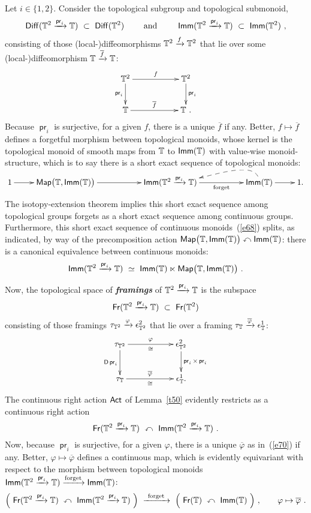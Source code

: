 \documentclass{amsart}
\theoremstyle{definition}
\theoremstyle{remark}
\DeclareMathOperator{\pr}{\mathsf{pr}}
\DeclareMathOperator{\Map}{{\sf Map}}
\newcommand{\bit}[1]{\textbf{\textit{#1}}}
\newcommand{\racts}{\curvearrowleft}
\DeclareMathOperator{\Diff}{{\sf Diff}}
\newcommand{\ov}{\overline}
\newcommand{\xra}{\xrightarrow}
\DeclareMathOperator{\Fr}{\sf Fr}
\DeclareMathOperator{\Act}{\sf Act}
\DeclareMathOperator{\Imm}{\sf Imm}
\begin{document}
Let $ i\in \{1,2\}$.
Consider the topological subgroup and topological submonoid,
\[
\Diff(\TT^2 \xra{\pr_i} \TT)
~\subset~
\Diff(\TT^2)
\qquad
\text{ and }
\qquad
\Imm(\TT^2 \xra{\pr_i} \TT)
~\subset~
\Imm(\TT^2)
~,
\]
consisting of those (local-)diffeomorphisms $\TT^2\xra{f} \TT^2$ that lie over some (local-)diffeomorphism $\TT\xra{\ov{f}} \TT$:
\[
\xymatrix{
\TT^2
\ar[rr]^-f
\ar[d]_-{\pr_i}
&&
\TT^2 \ar[d]^-{\pr_i}
\\
\TT
\ar[rr]^-{\ov{f}}
&&
\TT
~.
}
\]
Because $\pr_i$ is surjective, for a given $f$, there is a unique $\ov{f}$ if any.
Better, $f\mapsto \ov{f}$ defines a forgetful morphism between topological monoids, whose kernel is the topological monoid of smooth maps from $\mathbb T$ to $\Imm(\TT)$ with value-wise monoid-structure, which is to say
there is a short exact sequence of topological monoids:
\begin{equation}
\label{e68}
\xymatrix{
1
\ar[r] 
&
\Map\bigl( \TT , \Imm(\TT) \bigr) 
\ar[rr]
&&
\Imm(\TT^2 \xra{\pr_i} \TT)
\ar[rr]_-{ \rm forget }
&&
\Imm(\TT)
\ar[r]
\ar@{-->}@(u,-)[ll]
&
1
.
}
\end{equation}
The isotopy-extension theorem implies this short exact sequence among topological groups forgets as a short exact sequence among continuous groups.  
Furthermore, this short exact sequence of continuous monoids~(\ref{e68}) splits, as indicated, by way of the precomposition action $\Map\bigl( \TT , \Imm(\TT) \bigr)  \racts \Imm(\TT)$:
there is a canonical equivalence between continuous monoids:
\begin{equation*}
\Imm(\TT^2 \xra{\pr_i} \TT)
~\simeq~
\Imm(\TT)  \ltimes  \Map\bigl( \TT , \Imm(\TT) \bigr)
~.
\end{equation*}





Now, the topological space of \bit{framings} of $\TT^2 \xra{\pr_i} \TT$ is the subspace
\[
\Fr(\TT^2 \xra{\pr_i} \TT)
~\subset~
\Fr(\TT^2)
\]
consisting of those framings $\tau_{\TT^2}\xra{\varphi} \epsilon^2_{\TT^2}$ that lie over a framing $\tau_{\TT} \xra{\ov{\varphi}} \epsilon^1_{\TT}$:
\begin{equation}
\label{e70}
\xymatrix{
\tau_{\TT^2}
\ar[rr]^-{\varphi}_-{\cong}
\ar[d]_-{\sD \pr_i}
&&
\epsilon^2_{\TT^2}
\ar[d]^-{\pr_i \times \pr_i}
\\
\tau_{\TT}
\ar[rr]^-{\ov{\varphi}}_-{\cong}
&&
\epsilon^1_{\TT}
.
}
\end{equation}
The continuous right action $\Act$ of Lemma~\ref{t50} evidently restricts as a continuous right action
\[
\Fr(\TT^2 \xra{\pr_i} \TT)
~\racts~
\Imm(\TT^2 \xra{\pr_i} \TT)
~.
\]
Now, because $\pr_i$ is surjective, for a given $\varphi$, there is a unique $\ov{\varphi}$ as in~(\ref{e70}) if any.  
Better, $\varphi\mapsto \ov{\varphi}$ defines a continuous map, which is evidently equivariant with respect to the morphism between topological monoids $\Imm(\TT^2 \xra{\pr_i} \TT) \xra{\rm forget} \Imm(\TT)$:
\[
\Bigl(
~
\Fr(\TT^2 \xra{\pr_i} \TT)
~\racts~
\Imm(\TT^2 \xra{\pr_i} \TT)
~\Bigr)
~
\xra{~\rm forget~}
~
\Bigl(
~
\Fr(\TT)
~\racts~
\Imm(\TT)
~\Bigr)
~,\qquad
\varphi
\mapsto 
\ov{\varphi}
~.
\]
\end{document}
